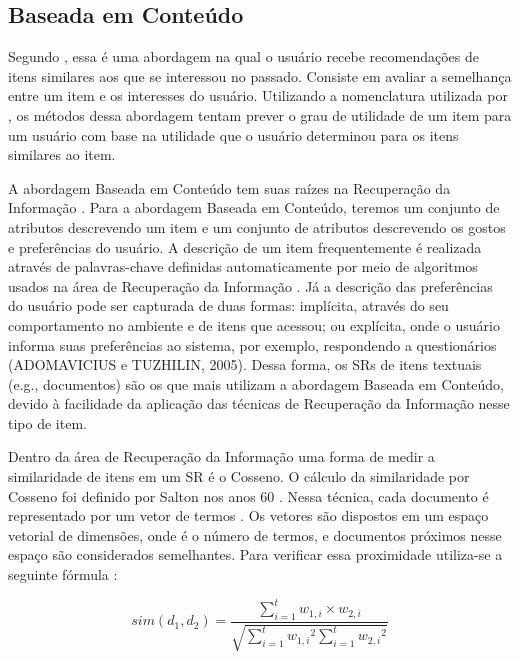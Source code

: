 \subsection{Baseada em Conteúdo}\label{section:baseada-em-conteudo}

Segundo , essa é uma abordagem na qual o usuário recebe recomendações de itens
similares aos que se interessou no passado. Consiste em avaliar a semelhança entre um item e os interesses do usuário.
Utilizando a nomenclatura utilizada por , os métodos dessa abordagem tentam prever o
grau de utilidade de um item para um usuário com base na utilidade que o usuário determinou para os itens similares ao item.

A abordagem Baseada em Conteúdo tem suas raízes na Recuperação da Informação \cite{adomavicius2005toward}. Para a
abordagem Baseada em Conteúdo, teremos um conjunto de atributos descrevendo um item e um conjunto de atributos
descrevendo os gostos e preferências do usuário. A descrição de um item frequentemente é realizada através de
palavras-chave definidas automaticamente por meio de algoritmos usados na área de Recuperação da Informação
\cite{adomavicius2005toward}. Já a descrição das preferências do usuário pode ser capturada de duas formas: implícita,
através do seu comportamento no ambiente e de itens que acessou; ou explícita, onde o usuário informa suas preferências
ao sistema, por exemplo, respondendo a questionários (ADOMAVICIUS e TUZHILIN, 2005). Dessa forma, os SRs de itens
textuais (e.g., documentos) são os que mais utilizam a abordagem Baseada em Conteúdo, devido à facilidade da aplicação
das técnicas de Recuperação da Informação nesse tipo de item.

Dentro da área de Recuperação da Informação uma forma de medir a similaridade de itens em um SR é o Cosseno. O cálculo
da similaridade por Cosseno foi definido por Salton nos anos 60 \cite{salton1964document}. Nessa técnica, cada documento
é representado por um vetor de termos . Os vetores são dispostos em um espaço vetorial de  dimensões, onde  é o número
de termos, e documentos próximos nesse espaço são considerados semelhantes. Para verificar essa proximidade utiliza-se a
seguinte fórmula \cite{christopher2008introduction}:

\begin{equation}
  sim(d_1, d_2) = \frac{\sum_{i=1}^{t}{w_{1,i} \times w_{2,i}}}{\sqrt{\sum_{i=1}^{t}{w_{1,i}}^2 \sum_{i=1}^{t}{w_{2,i}}^2}}
  \label{eq:cosseno}
\end{equation}



